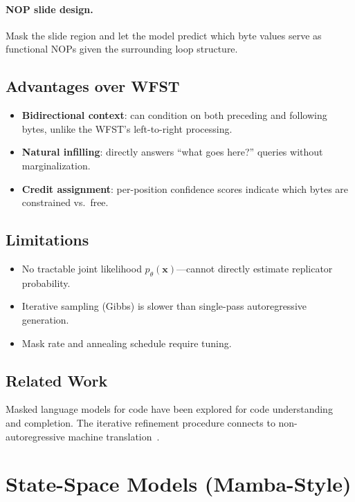 \documentclass{article}
\begin{document}
\paragraph{NOP slide design.}
Mask the slide region and let the model predict which byte values serve
as functional NOPs given the surrounding loop structure.

\subsection{Advantages over WFST}

\begin{itemize}
  \item \textbf{Bidirectional context}: can condition on both preceding
        and following bytes, unlike the WFST's left-to-right processing.
  \item \textbf{Natural infilling}: directly answers ``what goes here?''
        queries without marginalization.
  \item \textbf{Credit assignment}: per-position confidence scores indicate
        which bytes are constrained vs.\ free.
\end{itemize}

\subsection{Limitations}

\begin{itemize}
  \item No tractable joint likelihood $p_\theta(\mathbf{x})$---cannot
        directly estimate replicator probability.
  \item Iterative sampling (Gibbs) is slower than single-pass autoregressive
        generation.
  \item Mask rate and annealing schedule require tuning.
\end{itemize}

\subsection{Related Work}

Masked language models for code have been explored for code
understanding~\cite{feng2020codebert} and completion.
The iterative refinement procedure connects to
non-autoregressive machine translation~\cite{ghazvininejad2019mask}.


\section{State-Space Models (Mamba-Style)}
\label{sec:ssm}
\end{document}
